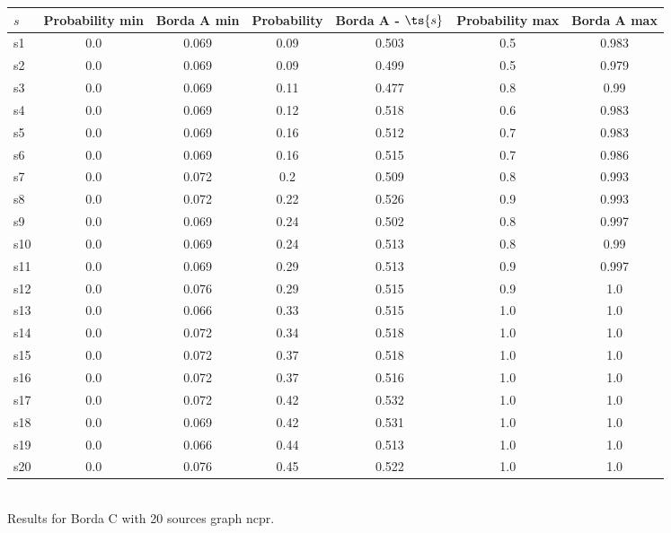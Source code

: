 \documentclass{article}
\begin{document}
\noindent\begin{tabular}{|l|c|c|c|c|c|c|}
\hline
$s$& Probability min & Borda A min & Probability & Borda A - $\ts{s}$ & Probability max & Borda A max\\
\hline
s1 &0.0 & 0.069 & 0.09 & 0.503 & 0.5 & 0.983\\
\hline
s2 &0.0 & 0.069 & 0.09 & 0.499 & 0.5 & 0.979\\
\hline
s3 &0.0 & 0.069 & 0.11 & 0.477 & 0.8 & 0.99\\
\hline
s4 &0.0 & 0.069 & 0.12 & 0.518 & 0.6 & 0.983\\
\hline
s5 &0.0 & 0.069 & 0.16 & 0.512 & 0.7 & 0.983\\
\hline
s6 &0.0 & 0.069 & 0.16 & 0.515 & 0.7 & 0.986\\
\hline
s7 &0.0 & 0.072 & 0.2 & 0.509 & 0.8 & 0.993\\
\hline
s8 &0.0 & 0.072 & 0.22 & 0.526 & 0.9 & 0.993\\
\hline
s9 &0.0 & 0.069 & 0.24 & 0.502 & 0.8 & 0.997\\
\hline
s10 &0.0 & 0.069 & 0.24 & 0.513 & 0.8 & 0.99\\
\hline
s11 &0.0 & 0.069 & 0.29 & 0.513 & 0.9 & 0.997\\
\hline
s12 &0.0 & 0.076 & 0.29 & 0.515 & 0.9 & 1.0\\
\hline
s13 &0.0 & 0.066 & 0.33 & 0.515 & 1.0 & 1.0\\
\hline
s14 &0.0 & 0.072 & 0.34 & 0.518 & 1.0 & 1.0\\
\hline
s15 &0.0 & 0.072 & 0.37 & 0.518 & 1.0 & 1.0\\
\hline
s16 &0.0 & 0.072 & 0.37 & 0.516 & 1.0 & 1.0\\
\hline
s17 &0.0 & 0.072 & 0.42 & 0.532 & 1.0 & 1.0\\
\hline
s18 &0.0 & 0.069 & 0.42 & 0.531 & 1.0 & 1.0\\
\hline
s19 &0.0 & 0.066 & 0.44 & 0.513 & 1.0 & 1.0\\
\hline
s20 &0.0 & 0.076 & 0.45 & 0.522 & 1.0 & 1.0\\
\hline
\end{tabular}\\

\noindent Results for Borda C with 20 sources graph ncpr.
\end{document}

